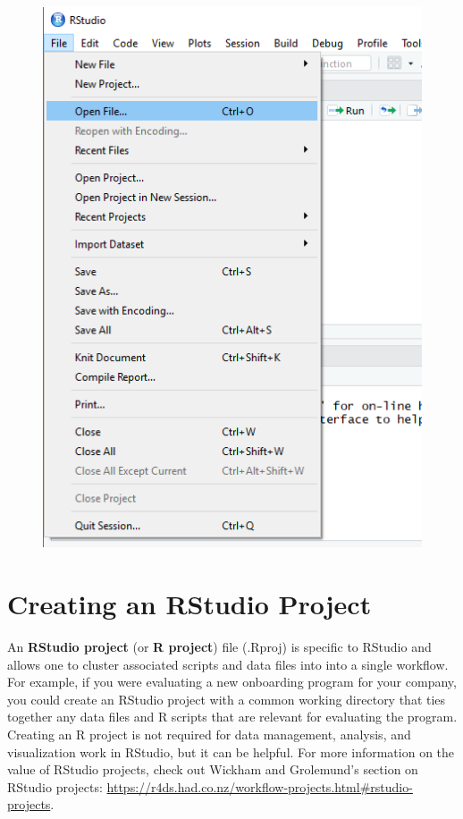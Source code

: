\documentclass[]{book}
\begin{document}
\begin{figure}
\centering
\includegraphics{Opening R Script.png}
\caption{}
\end{figure}

\section{Creating an RStudio Project}\label{creating-an-rstudio-project}

An \textbf{RStudio project} (or \textbf{R project}) file (.Rproj) is
specific to RStudio and allows one to cluster associated scripts and
data files into into a single workflow. For example, if you were
evaluating a new onboarding program for your company, you could create
an RStudio project with a common working directory that ties together
any data files and R scripts that are relevant for evaluating the
program. Creating an R project is not required for data management,
analysis, and visualization work in RStudio, but it can be helpful. For
more information on the value of RStudio projects, check out Wickham and
Grolemund's \citeyearpar{wickham2017} section on RStudio projects:
\url{https://r4ds.had.co.nz/workflow-projects.html\#rstudio-projects}.
\end{document}
